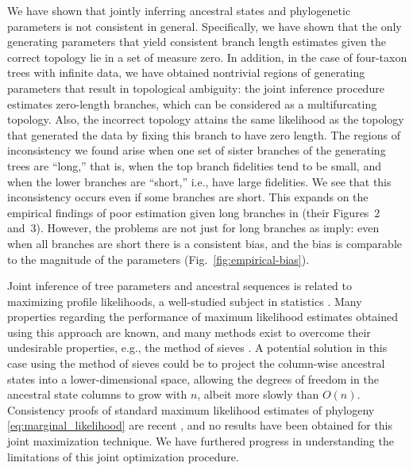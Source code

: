 \documentclass[11pt]{article}
\newcommand{\nCols}{n}
\begin{document}
We have shown that jointly inferring ancestral states and phylogenetic parameters \citep{Sagulenko2018-xl} is not consistent in general.
Specifically, we have shown that the only generating parameters that yield consistent branch length estimates given the correct topology lie in a set of measure zero.
In addition, in the case of four-taxon trees with infinite data, we have obtained nontrivial regions of generating parameters that result in topological ambiguity: the joint inference procedure estimates zero-length branches, which can be considered as a multifurcating topology.
Also, the incorrect topology attains the same likelihood as the topology that generated the data by fixing this branch to have zero length.
The regions of inconsistency we found arise when one set of sister branches of the generating trees are ``long,'' that is, when the top branch fidelities tend to be small, and when the lower branches are ``short,'' i.e., have large fidelities.
We see that this inconsistency occurs even if some branches are short.
This expands on the empirical findings of poor estimation given long branches in \citet{Sagulenko2018-xl} (their Figures~2 and~3).
However, the problems are not just for long branches as \citet{Sagulenko2018-xl} imply: even when all branches are short there is a consistent bias, and the bias is comparable to the magnitude of the parameters (Fig.~\ref{fig:empirical-bias}).

Joint inference of tree parameters and ancestral sequences is related to maximizing profile likelihoods, a well-studied subject in statistics \citep{Murphy2000-ry}.
Many properties regarding the performance of maximum likelihood estimates obtained using this approach are known, and many methods exist to overcome their undesirable properties, e.g., the method of sieves \citep{Geman1982}.
A potential solution in this case using the method of sieves could be to project the column-wise ancestral states into a lower-dimensional space, allowing the degrees of freedom in the ancestral state columns to grow with $\nCols$, albeit more slowly than $O(\nCols)$.
Consistency proofs of standard maximum likelihood estimates of phylogeny \eqref{eq:marginal_likelihood} are recent \citep{Allman2008-wd,Chai2011-ff,RoyChoudhury2015-ta}, and no results have been obtained for this joint maximization technique.
We have furthered progress in understanding the limitations of this joint optimization procedure.
\end{document}

